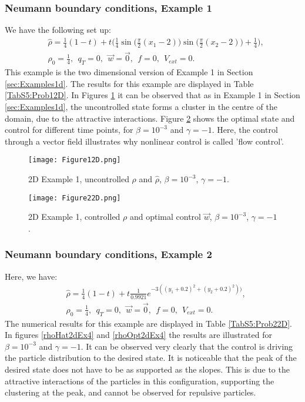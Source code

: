 \subsubsection{Neumann boundary conditions, Example 1}	
We have the following set up:
\begin{align*}
&\widehat \rho = \frac{1}{4}(1-t) + t\bigg(\frac{1}{4}\sin \bigg(\frac{\pi}{2}(x_1 - 2)\bigg)\sin \bigg(\frac{\pi}{2}(x_2 - 2)\bigg) + \frac{1}{4}\bigg),\\
&\rho_0 = \frac{1}{4},\ \
q_{T} = 0,\ \
\vec{w} = \vec{0},\ \
f =0,\ \
V_{ext} =0.
\end{align*}
This example is the two dimensional version of Example 1 in Section \ref{sec:Examples1d}. The results for this example are displayed in Table \ref{TabS5:Prob12D}. In Figures \ref{rhoHat2dEx2} it can be observed that as in Example 1 in Section \ref{sec:Examples1d}, the uncontrolled state forms a cluster in the centre of the domain, due to the attractive interactions. Figure \ref{rhoOpt2dEx2} shows the optimal state and control for different time points, for $\beta = 10^{-3}$ and $\gamma = -1$. Here, the control through a vector field illustrates why nonlinear control is called 'flow control'. 


\begin{figure}[h]
	\texttt{[image: Figure12D.png]}
	\caption{2D Example 1, uncontrolled $\rho$ and $\widehat \rho$, $\beta = 10^{-3}$, $\gamma = -1$.}
	\label{rhoHat2dEx2}
\end{figure}
\begin{figure}[h]
	\texttt{[image: Figure22D.png]}
	\caption{2D Example 1, controlled $\rho$ and optimal control $\vec{w}$, $\beta = 10^{-3}$, $\gamma = -1$.}
	\label{rhoOpt2dEx2}
\end{figure}


\subsubsection{Neumann boundary conditions, Example 2}	
Here, we have:
\begin{align*}
&\widehat \rho = \frac{1}{4}(1-t) + t\frac{1}{0.9921}e^{-3((y_1+0.2)^2 + (y_2+0.2)^2))},\\
&\rho_0 = \frac{1}{4},\ \
q_{T} = 0,\ \
\vec{w} = \vec{0},\ \
f =0,\ \
V_{ext} =0.
\end{align*}
The numerical results for this example are displayed in Table \ref{TabS5:Prob22D}. In figures \ref{rhoHat2dEx4} and \ref{rhoOpt2dEx4} the results are illustrated for $\beta = 10^{-3}$ and $\gamma = -1$. It can be observed very clearly that the control is driving the particle distribution to the desired state. It is noticeable that the peak of the desired state does not have to be as supported as the slopes. This is due to the attractive interactions of the particles in this configuration, supporting the clustering at the peak, and cannot be observed for repulsive particles.



